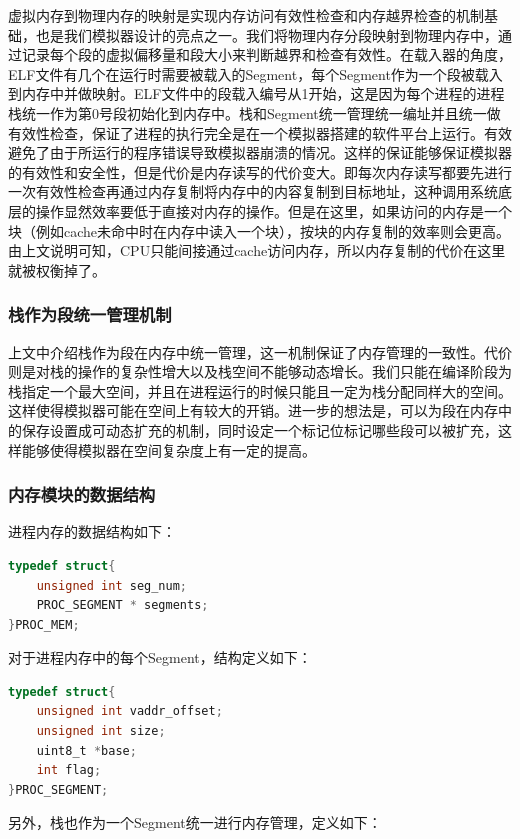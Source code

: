 \documentclass[12pt,a4paper]{article}
\begin{document}
虚拟内存到物理内存的映射是实现内存访问有效性检查和内存越界检查的机制基础，也是我们模拟器设计的亮点之一。我们将物理内存分段映射到物理内存中，通过记录每个段的虚拟偏移量和段大小来判断越界和检查有效性。在载入器的角度，ELF文件有几个在运行时需要被载入的Segment，每个Segment作为一个段被载入到内存中并做映射。ELF文件中的段载入编号从1开始，这是因为每个进程的进程栈统一作为第0号段初始化到内存中。栈和Segment统一管理统一编址并且统一做有效性检查，保证了进程的执行完全是在一个模拟器搭建的软件平台上运行。有效避免了由于所运行的程序错误导致模拟器崩溃的情况。这样的保证能够保证模拟器的有效性和安全性，但是代价是内存读写的代价变大。即每次内存读写都要先进行一次有效性检查再通过内存复制将内存中的内容复制到目标地址，这种调用系统底层的操作显然效率要低于直接对内存的操作。但是在这里，如果访问的内存是一个块（例如cache未命中时在内存中读入一个块），按块的内存复制的效率则会更高。由上文说明可知，CPU只能间接通过cache访问内存，所以内存复制的代价在这里就被权衡掉了。

\subsubsection{栈作为段统一管理机制}

上文中介绍栈作为段在内存中统一管理，这一机制保证了内存管理的一致性。代价则是对栈的操作的复杂性增大以及栈空间不能够动态增长。我们只能在编译阶段为栈指定一个最大空间，并且在进程运行的时候只能且一定为栈分配同样大的空间。这样使得模拟器可能在空间上有较大的开销。进一步的想法是，可以为段在内存中的保存设置成可动态扩充的机制，同时设定一个标记位标记哪些段可以被扩充，这样能够使得模拟器在空间复杂度上有一定的提高。

\subsubsection{内存模块的数据结构}
进程内存的数据结构如下：

\begin{lstlisting}[language={C}]
typedef struct{
    unsigned int seg_num;
    PROC_SEGMENT * segments;
}PROC_MEM;
\end{lstlisting}

对于进程内存中的每个Segment，结构定义如下：

\begin{lstlisting}[language={C}]
typedef struct{
    unsigned int vaddr_offset;
    unsigned int size;
    uint8_t *base;
    int flag;
}PROC_SEGMENT;
\end{lstlisting}

另外，栈也作为一个Segment统一进行内存管理，定义如下：
\end{document}
